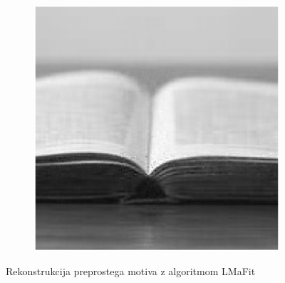 \begin{figure}
\begin{subfigure}{0.325\linewidth}
    \end{subfigure}
    \hfill
    \begin{subfigure}{0.325\linewidth}
        \includegraphics[width=\linewidth]{Poglavja/Slike/kompleksnost/preprosta grayscale 300/rez60LMaFit.png}
    \end{subfigure}
    \caption{Rekonstrukcija preprostega motiva z algoritmom LMaFit}
\end{figure}

